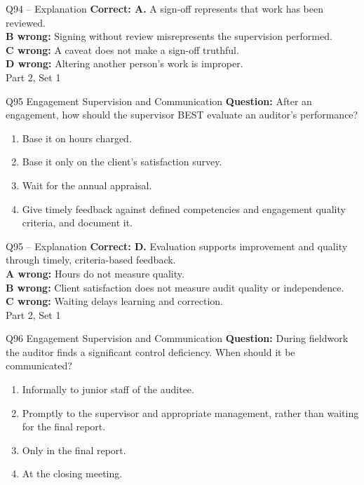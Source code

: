 \documentclass[aspectratio=169,10pt]{beamer}
\begin{document}
\begin{frame}[t]{Q94 -- Explanation}
	\footnotesize
	\textbf{Correct: A.} A sign-off represents that work has been reviewed. \\[5pt]
\textbf{B wrong:} Signing without review misrepresents the supervision performed. \\[3pt]
\textbf{C wrong:} A caveat does not make a sign-off truthful. \\[3pt]
\textbf{D wrong:} Altering another person's work is improper. \\[3pt]
	\vfill {\tiny Part 2, Set 1}
\end{frame}
\begin{frame}[t]{Q95 \hfill {\scriptsize Engagement Supervision and Communication}}
	\small
	\textbf{Question:} After an engagement, how should the supervisor BEST evaluate an auditor's performance?
	\begin{enumerate}[label=\Alph*.,itemsep=1pt,topsep=3pt]
			\item Base it on hours charged.
			\item Base it only on the client's satisfaction survey.
			\item Wait for the annual appraisal.
			\item Give timely feedback against defined competencies and engagement quality criteria, and document it.
	\end{enumerate}
\end{frame}
\begin{frame}[t]{Q95 -- Explanation}
	\footnotesize
	\textbf{Correct: D.} Evaluation supports improvement and quality through timely, criteria-based feedback. \\[5pt]
\textbf{A wrong:} Hours do not measure quality. \\[3pt]
\textbf{B wrong:} Client satisfaction does not measure audit quality or independence. \\[3pt]
\textbf{C wrong:} Waiting delays learning and correction. \\[3pt]
	\vfill {\tiny Part 2, Set 1}
\end{frame}
\begin{frame}[t]{Q96 \hfill {\scriptsize Engagement Supervision and Communication}}
	\small
	\textbf{Question:} During fieldwork the auditor finds a significant control deficiency. When should it be communicated?
	\begin{enumerate}[label=\Alph*.,itemsep=1pt,topsep=3pt]
			\item Informally to junior staff of the auditee.
			\item Promptly to the supervisor and appropriate management, rather than waiting for the final report.
			\item Only in the final report.
			\item At the closing meeting.
	\end{enumerate}
\end{frame}
\end{document}
